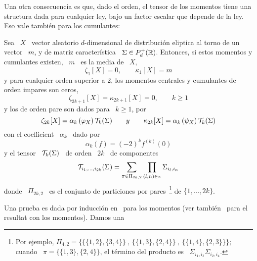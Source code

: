 Una otra consecuencia es que, dado el orden, el tensor de los momentos tiene una
structura dada para cualquier ley, bajo un factor escalar que depende de la ley.
Eso vale tambi\'en para los cumulantes:
%
\begin{teorema}\label{Teo:MP:MomentosCumulantesEliptica}
%
  Sea \  $X$ \  vector aleatorio $d$-dimensional  de distribuci\'on  eliptica al
  torno  de  un  vector \  $m$,  y  de  matriz  caracter\'istica \  $\Sigma  \in
  P_d^+(\mathbb{R})$.  Entonces, si  estos momentos y cumulantes existen,  \ $m$ \ es
  la media de \ $X$, \ie
  \[
  \zeta_1[X] = 0, \qquad \kappa_1[X] = m
  \]
  y para cualquier orden superior a  $2$, los momentos centrales y cumulantes de
  orden impares son ceros,
  \[
  \zeta_{2 k + 1}[X] = \kappa_{2 k + 1}[X] = 0, \qquad k \ge 1
  \]
  y los de orden pare son dados para \ $k \ge 1$, por
  \[
  \zeta_{2 k}[X] = \alpha_k\left(  \varphi_X   \right) \mathcal{T}_k(\Sigma)
 \qquad  y \qquad \kappa_{2 k}[X] = \alpha_k\left(  \psi_X   \right) \mathcal{T}_k(\Sigma)
  \]
  con el coefficient \ $\alpha_k$ \ dado por
  \[
  \alpha_k(f) = (-2)^k f^{(k)}(0)
  \]
  y el tensor \ $\mathcal{T}_k(\Sigma)$ \ de orden \ $2 k$ \ de componentes
  \[
  \mathcal{T}_{i_1,\ldots,i_{2k}}(\Sigma) = \sum_{\pi \in \Pi_{2 k , 2}} \prod_{(l,n) \in
    \pi} \Sigma_{i_l,i_n}
  \]
  donde   \  $\Pi_{2   k  ,   2}$   \  es   el  conjunto   de  particiones   por
  pares~\footnote{Por  ejemplo, $\Pi_{4,2}  =  \Big\{ \big\{  \{1,2\} ,  \{3,4\}
    \big\} \:  , \: \big\{  \{1,3\} ,  \{2,4\} \big\} \:  , \: \big\{  \{1,4\} ,
    \{2,3\} \big\} \big\}$; cuando \ $\pi = \big\{ \{1,3\} , \{2,4\} \Big\}$, el
    t\'ermino del producto es \ $\Sigma_{i_1,i_3} \Sigma_{i_2,i_4}$.} de $\{ 1 ,
  \ldots , 2 k \}$.
\end{teorema}
%
Una prueba  es dada  por inducci\'on en~\cite{BerBen86}  para los  momentos (ver
tambi\'en~\cite[p.~44]{FanKot90} para el resultat  con los momentos).  Damos una
